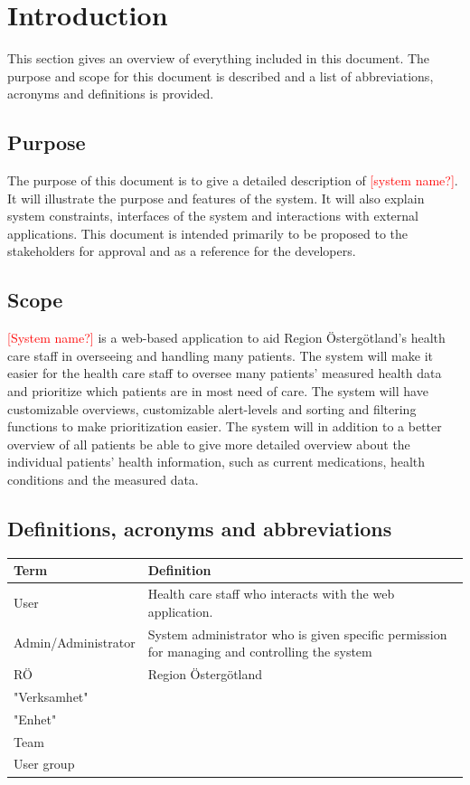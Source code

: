 \documentclass{scrreprt}
\begin{document}
\chapter{Introduction}
This section gives an overview of everything included in this document. The purpose and scope for this document is described and a list of abbreviations, acronyms and definitions is provided. 

\section{Purpose}
The purpose of this document is to give a detailed description of \textcolor{red}{[system name?]}. It will illustrate the purpose and features of the system. It will also explain system constraints, interfaces of the system and interactions with external applications. This document is intended primarily to be proposed to the stakeholders for approval and as a reference for the developers.

\section{Scope}
\textcolor{red}{[System name?]} is a web-based application to aid Region Östergötland's health care staff in overseeing and handling many patients. The system will make it easier for the health care staff to oversee many patients' measured health data and prioritize which patients are in most need of care. The system will have customizable overviews, customizable alert-levels and sorting and filtering functions to make prioritization easier. The system will in addition to a better overview of all patients be able to give more detailed overview about the individual patients' health information, such as current medications, health conditions and the measured data. 


\section{Definitions, acronyms and abbreviations}
\begin{center}
\begin{tabularx}{\linewidth}{| l | X |}
 \hline
 \textbf{Term} & \textbf{Definition} \\ 
 \hline
  User  & Health care staff who interacts with the web application.  \\
  \hline
  Admin/Administrator & System administrator who is given specific permission for managing and controlling the system  \\ 
  \hline
  RÖ  & Region Östergötland  \\ 
  \hline
   "Verksamhet" & \\ 
  \hline 
  "Enhet" & \\
  \hline
  Team & \\ 
  \hline
  User group & \\ 
  \hline
\end{tabularx}
\end{center}
\end{document}
